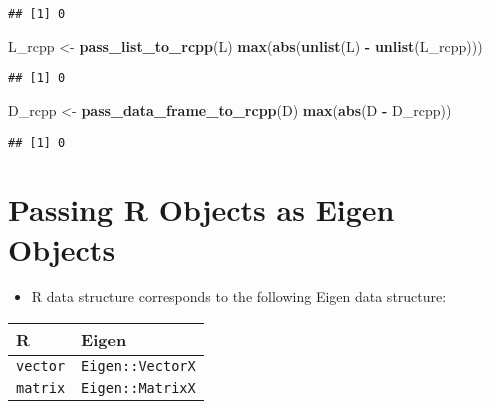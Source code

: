 \documentclass[
]{book}
\newenvironment{Shaded}{\begin{snugshade}}{\end{snugshade}}
\newcommand{\FunctionTok}[1]{\textcolor[rgb]{0.13,0.29,0.53}{\textbf{#1}}}
\newcommand{\NormalTok}[1]{#1}
\newcommand{\OtherTok}[1]{\textcolor[rgb]{0.56,0.35,0.01}{#1}}
\newcommand{\SpecialCharTok}[1]{\textcolor[rgb]{0.81,0.36,0.00}{\textbf{#1}}}
\providecommand{\tightlist}{%
  \setlength{\itemsep}{0pt}\setlength{\parskip}{0pt}}
\begin{document}
\begin{verbatim}
## [1] 0
\end{verbatim}

\begin{Shaded}
\begin{Highlighting}[]
\NormalTok{L\_rcpp }\OtherTok{\textless{}{-}} \FunctionTok{pass\_list\_to\_rcpp}\NormalTok{(L)}
\FunctionTok{max}\NormalTok{(}\FunctionTok{abs}\NormalTok{(}\FunctionTok{unlist}\NormalTok{(L) }\SpecialCharTok{{-}} \FunctionTok{unlist}\NormalTok{(L\_rcpp)))}
\end{Highlighting}
\end{Shaded}

\begin{verbatim}
## [1] 0
\end{verbatim}

\begin{Shaded}
\begin{Highlighting}[]
\NormalTok{D\_rcpp }\OtherTok{\textless{}{-}} \FunctionTok{pass\_data\_frame\_to\_rcpp}\NormalTok{(D)}
\FunctionTok{max}\NormalTok{(}\FunctionTok{abs}\NormalTok{(D }\SpecialCharTok{{-}}\NormalTok{ D\_rcpp))}
\end{Highlighting}
\end{Shaded}

\begin{verbatim}
## [1] 0
\end{verbatim}

\hypertarget{passing-r-objects-as-eigen-objects}{%
\section{Passing R Objects as Eigen Objects}\label{passing-r-objects-as-eigen-objects}}

\begin{itemize}
\tightlist
\item
  R data structure corresponds to the following Eigen data structure:
\end{itemize}

\begin{longtable}[]{@{}ll@{}}
\toprule\noalign{}
R & Eigen \\
\midrule\noalign{}
\endhead
\bottomrule\noalign{}
\endlastfoot
\texttt{vector} & \texttt{Eigen::VectorX} \\
\texttt{matrix} & \texttt{Eigen::MatrixX} \\
\end{longtable}
\end{document}
